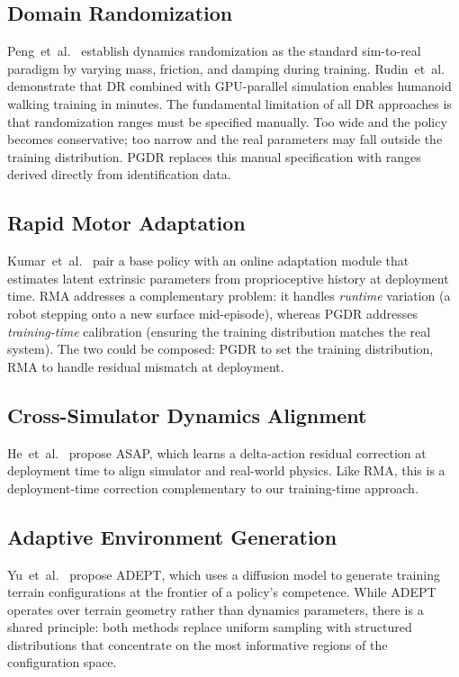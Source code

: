 \documentclass[10pt,twocolumn]{article}
\begin{document}
\subsection{Domain Randomization}

Peng~et~al.~\cite{peng2018sim2real} establish dynamics randomization as the standard sim-to-real paradigm by varying mass, friction, and damping during training.
Rudin~et~al.~\cite{rudin2022learning} demonstrate that DR combined with GPU-parallel simulation enables humanoid walking training in minutes.
The fundamental limitation of all DR approaches is that randomization ranges must be specified manually.
Too wide and the policy becomes conservative; too narrow and the real parameters may fall outside the training distribution.
PGDR replaces this manual specification with ranges derived directly from identification data.

\subsection{Rapid Motor Adaptation}

Kumar~et~al.~\cite{kumar2021rma} pair a base policy with an online adaptation module that estimates latent extrinsic parameters from proprioceptive history at deployment time.
RMA addresses a complementary problem: it handles \emph{runtime} variation (a robot stepping onto a new surface mid-episode), whereas PGDR addresses \emph{training-time} calibration (ensuring the training distribution matches the real system).
The two could be composed: PGDR to set the training distribution, RMA to handle residual mismatch at deployment.

\subsection{Cross-Simulator Dynamics Alignment}

He~et~al.~\cite{he2025asap} propose ASAP, which learns a delta-action residual correction at deployment time to align simulator and real-world physics.
Like RMA, this is a deployment-time correction complementary to our training-time approach.

\subsection{Adaptive Environment Generation}

Yu~et~al.~\cite{yu2025adept} propose ADEPT, which uses a diffusion model to generate training terrain configurations at the frontier of a policy's competence.
While ADEPT operates over terrain geometry rather than dynamics parameters, there is a shared principle: both methods replace uniform sampling with structured distributions that concentrate on the most informative regions of the configuration space.
\end{document}
